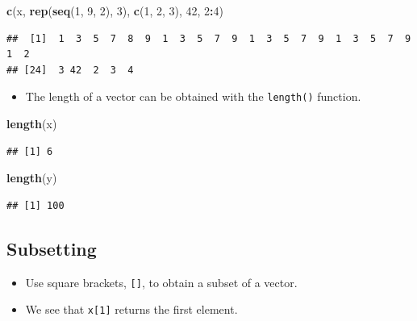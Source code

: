 \documentclass[]{book}
\newenvironment{Shaded}{\begin{snugshade}}{\end{snugshade}}
\newcommand{\KeywordTok}[1]{\textcolor[rgb]{0.13,0.29,0.53}{\textbf{#1}}}
\newcommand{\DecValTok}[1]{\textcolor[rgb]{0.00,0.00,0.81}{#1}}
\newcommand{\OperatorTok}[1]{\textcolor[rgb]{0.81,0.36,0.00}{\textbf{#1}}}
\newcommand{\NormalTok}[1]{#1}
\providecommand{\tightlist}{%
  \setlength{\itemsep}{0pt}\setlength{\parskip}{0pt}}
\begin{document}
\begin{Shaded}
\begin{Highlighting}[]
\KeywordTok{c}\NormalTok{(x, }\KeywordTok{rep}\NormalTok{(}\KeywordTok{seq}\NormalTok{(}\DecValTok{1}\NormalTok{, }\DecValTok{9}\NormalTok{, }\DecValTok{2}\NormalTok{), }\DecValTok{3}\NormalTok{), }\KeywordTok{c}\NormalTok{(}\DecValTok{1}\NormalTok{, }\DecValTok{2}\NormalTok{, }\DecValTok{3}\NormalTok{), }\DecValTok{42}\NormalTok{, }\DecValTok{2}\OperatorTok{:}\DecValTok{4}\NormalTok{)}
\end{Highlighting}
\end{Shaded}

\begin{verbatim}
##  [1]  1  3  5  7  8  9  1  3  5  7  9  1  3  5  7  9  1  3  5  7  9  1  2
## [24]  3 42  2  3  4
\end{verbatim}

\begin{itemize}
\tightlist
\item
  The length of a vector can be obtained with the \texttt{length()}
  function.
\end{itemize}

\begin{Shaded}
\begin{Highlighting}[]
\KeywordTok{length}\NormalTok{(x)}
\end{Highlighting}
\end{Shaded}

\begin{verbatim}
## [1] 6
\end{verbatim}

\begin{Shaded}
\begin{Highlighting}[]
\KeywordTok{length}\NormalTok{(y)}
\end{Highlighting}
\end{Shaded}

\begin{verbatim}
## [1] 100
\end{verbatim}

\subsection{Subsetting}\label{subsetting}

\begin{itemize}
\tightlist
\item
  Use square brackets, \texttt{{[}{]}}, to obtain a subset of a vector.
\item
  We see that \texttt{x{[}1{]}} returns the first element.
\end{itemize}
\end{document}
